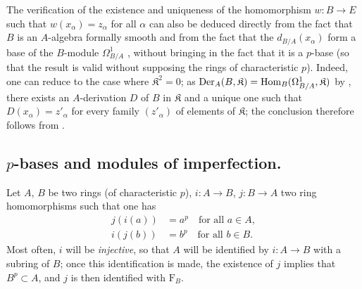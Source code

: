 \begin{remark}[21.2.8]
\label{0.21.2.8}
The verification of the existence and uniqueness of the homomorphism $w:B\to E$ such that $w(x_\alpha)=z_\alpha$ for all $\alpha$ can also be deduced directly from the fact that $B$ is an $A$-algebra formally smooth and from the fact that the $d_{B/A}(x_\alpha)$ form a base of the $B$-module $\Omega^1_{B/A}$ , without bringing in the fact that it is a $p$-base (so that the result is valid without supposing the rings of characteristic $p$).
Indeed, one can reduce to the case where $\mathfrak K^2=0$; as $\operatorname{Der}_A(B,\mathfrak K)=\operatorname{Hom}_B(\Omega^1_{B/A},\mathfrak K)$ by , there exists an $A$-derivation $D$ of $B$ in $\mathfrak K$ and a unique one such that $D(x_\alpha)=z'_\alpha$ for every family $(z'_\alpha)$ of elements of $\mathfrak K$; the conclusion therefore follows from .
\end{remark}

\subsection{\texorpdfstring{$p$}{p}-bases and modules of imperfection.}
\label{subsection:0.21.3}

\begin{env}[21.3.1]
\label{0.21.3.1}
Let $A$, $B$ be two rings (of characteristic $p$), $i:A\to B$, $j:B\to A$ two ring homomorphisms such that one has
\begin{align}
\tag{21.3.1.1}
  \label{0.21.3.1.1}
  j(i(a))&=a^p \quad\text{for all } a\in A, \\
\tag{21.3.1.2}
  \label{0.21.3.1.2}
  i(j(b))&=b^p \quad\text{for all } b\in B.
\end{align}
Most often, $i$ will be \emph{injective}, so that $A$ will be identified by $i:A\to B$ with a subring of $B$; once this identification is made, the existence of $j$ implies that $B^p\subset A$, and $j$ is then identified with $\mathrm{F}_B$.
\end{env}

